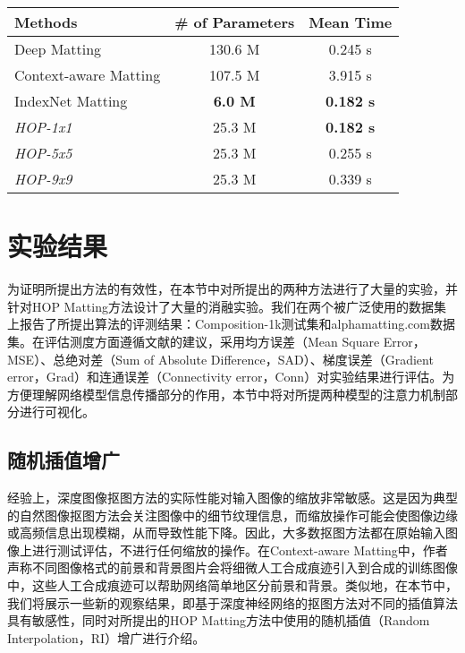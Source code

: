 \begin{table}[t]
	\setlength{\tabcolsep}{15pt}
	\centering
	\begin{tabular}{l|cc}  
		\toprule
		Methods & \# of Parameters & Mean Time \\
		\midrule
		Deep Matting\cite{xu2017deep} &	130.6 M & 0.245 s \\
		Context-aware Matting\cite{hou2019context} & 107.5 M & 3.915 s\\
		IndexNet Matting\cite{lu2019indices} &	\textbf{6.0 M} &\textbf{ 0.182 s}\\	
		\midrule
		\textit{HOP-1x1} & 25.3 M & \textbf{0.182 s} \\
		\textit{HOP-5x5} & 25.3 M & 0.255 s \\
		\textit{HOP-9x9} & 25.3 M & 0.339 s \\
		\bottomrule
	\end{tabular}
	\label{tab5:eff}
\end{table}

\section{实验结果}
为证明所提出方法的有效性，在本节中对所提出的两种方法进行了大量的实验，并针对HOP Matting方法设计了大量的消融实验。我们在两个被广泛使用的数据集上报告了所提出算法的评测结果：Composition-1k测试集\cite{xu2017deep}和alphamatting.com数据集\cite{rhemann2009perceptually}。在评估测度方面遵循文献\parencite{rhemann2009perceptually}的建议，采用均方误差（Mean Square Error，MSE）、总绝对差（Sum of Absolute Difference，SAD）、梯度误差（Gradient error，Grad）和连通误差（Connectivity error，Conn）对实验结果进行评估。为方便理解网络模型信息传播部分的作用，本节中将对所提两种模型的注意力机制部分进行可视化。

\subsection{随机插值增广}
\label{sec5:RI}
经验上，深度图像抠图方法的实际性能对输入图像的缩放非常敏感。这是因为典型的自然图像抠图方法会关注图像中的细节纹理信息，而缩放操作可能会使图像边缘或高频信息出现模糊，从而导致性能下降。因此，大多数抠图方法都在原始输入图像上进行测试评估，不进行任何缩放的操作。在Context-aware Matting\cite{hou2019context}中，作者声称不同图像格式的前景和背景图片会将细微人工合成痕迹引入到合成的训练图像中，这些人工合成痕迹可以帮助网络简单地区分前景和背景。类似地，在本节中，我们将展示一些新的观察结果，即基于深度神经网络的抠图方法对不同的插值算法具有敏感性，同时对所提出的HOP Matting方法中使用的随机插值（Random Interpolation，RI）增广进行介绍。

